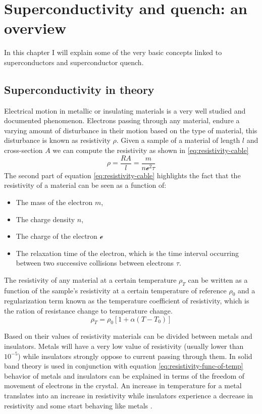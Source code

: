 \chapter{Superconductivity and quench: an overview}
\label{chp:soupcond-quench}
In this chapter I will explain some of the very basic concepts linked to superconductors and
superconductor quench.
\section{Superconductivity in theory}
\label{sec:soupcond}
Electrical motion in metallic or insulating materials is a very well studied and documented
phenomenon. Electrons passing through any material, endure a varying amount of disturbance in their
motion based on the type of material, this disturbance is known as resistivity $\rho$.
Given a sample of a material of length $l$ and cross-section $A$ we can compute the resistivity as
shown in \ref{eq:resistivity-cable}
\begin{equation}
	\label{eq:resistivity-cable}
	\rho = \frac{RA}{l} = \frac{m}{n\mathcal{e}^2\tau}
\end{equation}
The second part of equation \ref{eq:resistivity-cable} highlights the fact that the resistivity of a
material can be seen as a function of:
\begin{itemize}
	\item The mass of the electron $m$,
	\item The charge density $n$,
	\item The charge of the electron $\mathcal{e}$
	\item The relaxation time of the electron, which is the time interval occurring between two
	      successive collisions between electrons $\tau$.
\end{itemize}

The resistivity of any material at a certain temperature $\rho_T$ can be written as a function of
the sample's resistivity at a certain temperature of reference $\rho_0$ and a regularization term
known as the temperature coefficient of resistivity, which is the ration of resistance change to
temperature change.
\begin{equation}
	\label{eq:resistivity-func-of-temp}
	\rho_T = \rho_0[1 + \alpha(T - T_0)]
\end{equation}

Based on their values of resistivity materials can be divided between metals and insulators. Metals
will have a very low value of resistivity (usually lower than $10^{-5}$) while insulators strongly
oppose to current passing through them.
In \cite{slimani2022superconducting} solid band theory is used in conjunction with equation \ref{eq:resistivity-func-of-temp} behavior of metals and insulators can be explained in terms
of the freedom of movement of electrons in the crystal. An increase in temperature for a metal
translates into an increase in resistivity while insulators experience a decrease in resistivity
and some start behaving like metals \cite{slimani2022superconducting}.

